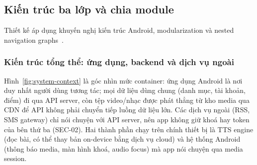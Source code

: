 \subsection{Kiến trúc ba lớp và chia module}
\label{sec:layered-architecture}

Thiết kế áp dụng khuyến nghị kiến trúc Android, modularization và nested navigation graphs~\cite{android-architecture,android-modularization,android-navigation}.

\subsubsection{Kiến trúc tổng thể: ứng dụng, backend và dịch vụ ngoài}
\label{sec:system-context}

Hình~\ref{fig:system-context} là góc nhìn mức container: ứng dụng Android là nơi duy nhất người dùng tương tác; mọi dữ liệu dùng chung (danh mục, tài khoản, điểm) đi qua API server, còn tệp video/nhạc được phát thẳng từ kho media qua CDN để API không phải chuyển tiếp luồng dữ liệu lớn. Các dịch vụ ngoài (RSS, SMS gateway) chỉ nói chuyện với API server, nên app không giữ khoá hay token của bên thứ ba (SEC-02). Hai thành phần chạy trên chính thiết bị là TTS engine (đọc bài, có thể thay bản on-device bằng dịch vụ cloud) và hệ thống Android (thông báo media, màn hình khoá, audio focus) mà app nói chuyện qua media session.

